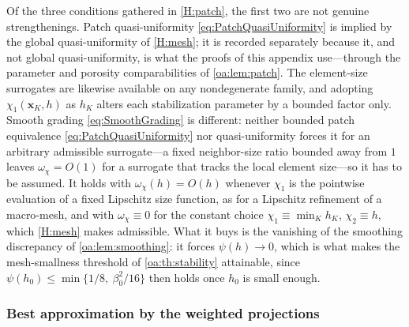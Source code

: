 \begin{remark}
\label{oa:rem:patchgrading}
Of the three conditions gathered in \cref{H:patch}, the first two are not genuine
strengthenings. Patch quasi{\hyp}uniformity \cref{eq:PatchQuasiUniformity} is implied by the
global quasi{\hyp}uniformity of \cref{H:mesh}; it is recorded separately because it, and not
global quasi{\hyp}uniformity, is what the proofs of this appendix use---through the parameter and
porosity comparabilities of \cref{oa:lem:patch}. The element{\hyp}size surrogates are likewise
available on any nondegenerate family, and adopting $\chi_1(\boldsymbol{x}_K,h)$ as $h_K$ alters
each stabilization parameter by a bounded factor only. Smooth grading \cref{eq:SmoothGrading} is
different: neither bounded patch equivalence \cref{eq:PatchQuasiUniformity} nor
quasi{\hyp}uniformity forces it for an arbitrary admissible surrogate---a fixed
neighbor{\hyp}size ratio bounded away from $1$ leaves $\omega_\chi = O(1)$ for a surrogate that
tracks the local element size---so it has to be assumed. It holds with $\omega_\chi(h) = O(h)$
whenever $\chi_1$ is the pointwise evaluation of a fixed Lipschitz size function, as for a
Lipschitz refinement of a macro{\hyp}mesh, and with $\omega_\chi \equiv 0$ for the constant
choice $\chi_1 \equiv \min_K h_K$, $\chi_2 \equiv h$, which \cref{H:mesh} makes admissible. What
it buys is the vanishing of the smoothing discrepancy of \cref{oa:lem:smoothing}: it forces
$\psi(h) \to 0$, which is what makes the mesh{\hyp}smallness threshold of
\cref{oa:th:stability} attainable, since $\psi(h_0) \le \min\{1/8,\ \beta_0^2/16\}$ then holds
once $h_0$ is small enough.
\end{remark}

\subsubsection{Best approximation by the weighted projections}

